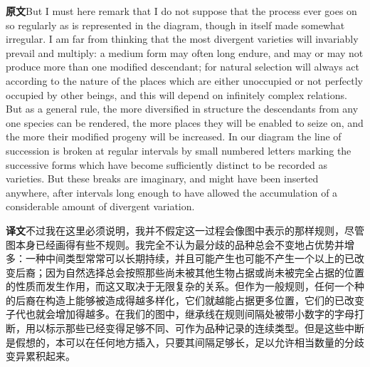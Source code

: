 \documentclass[UTF8,zihao=-4]{ctexart}
\newcommand{\BodyFont}{\fontsize{10.5pt}{15.5pt}\selectfont}
\newcommand{\origlabel}{\textbf{原文}\quad}
\newcommand{\translabel}{\textbf{译文}\quad}
\newenvironment{enblock}{\par\noindent\begingroup\BodyFont\origlabel}{\par\endgroup}
\newenvironment{zhblock}{\par\noindent\begingroup\BodyFont\translabel}{\par\endgroup\vspace{0.35em}}
\newcommand{\pair}[2]{\begin{enblock}#1\end{enblock}\begin{zhblock}#2\end{zhblock}}
\begin{document}
\pair{But I must here remark that I do not suppose that the process ever goes on so regularly as is represented in the diagram, though in itself made somewhat irregular. I am far from thinking that the most divergent varieties will invariably prevail and multiply: a medium form may often long endure, and may or may not produce more than one modified descendant; for natural selection will always act according to the nature of the places which are either unoccupied or not perfectly occupied by other beings, and this will depend on infinitely complex relations. But as a general rule, the more diversified in structure the descendants from any one species can be rendered, the more places they will be enabled to seize on, and the more their modified progeny will be increased. In our diagram the line of succession is broken at regular intervals by small numbered letters marking the successive forms which have become sufficiently distinct to be recorded as varieties. But these breaks are imaginary, and might have been inserted anywhere, after intervals long enough to have allowed the accumulation of a considerable amount of divergent variation.}{不过我在这里必须说明，我并不假定这一过程会像图中表示的那样规则，尽管图本身已经画得有些不规则。我完全不认为最分歧的品种总会不变地占优势并增多：一种中间类型常常可以长期持续，并且可能产生也可能不产生一个以上的已改变后裔；因为自然选择总会按照那些尚未被其他生物占据或尚未被完全占据的位置的性质而发生作用，而这又取决于无限复杂的关系。但作为一般规则，任何一个种的后裔在构造上能够被造成得越多样化，它们就越能占据更多位置，它们的已改变子代也就会增加得越多。在我们的图中，继承线在规则间隔处被带小数字的字母打断，用以标示那些已经变得足够不同、可作为品种记录的连续类型。但是这些中断是假想的，本可以在任何地方插入，只要其间隔足够长，足以允许相当数量的分歧变异累积起来。}
\end{document}

